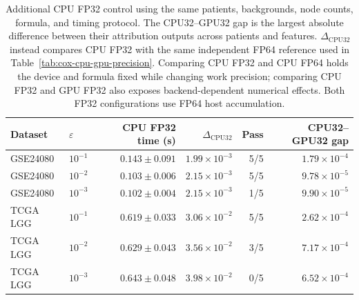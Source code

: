 \begin{table}[t]
\centering
\small
\setlength{\tabcolsep}{4pt}
\begin{tabular}{llrrrr}
\toprule
Dataset & $\varepsilon$ & CPU FP32 time (s) & $\Delta_{\mathrm{CPU32}}$ & Pass
& CPU32--GPU32 gap \\
\midrule
GSE24080 & $10^{-1}$ & $0.143\pm0.091$ & $1.99\times10^{-3}$ & 5/5 & $1.79\times10^{-4}$ \\
GSE24080 & $10^{-2}$ & $0.103\pm0.006$ & $2.15\times10^{-3}$ & 5/5 & $9.78\times10^{-5}$ \\
GSE24080 & $10^{-3}$ & $0.102\pm0.004$ & $2.15\times10^{-3}$ & 1/5 & $9.90\times10^{-5}$ \\
\midrule
TCGA LGG & $10^{-1}$ & $0.619\pm0.033$ & $3.06\times10^{-2}$ & 5/5 & $2.62\times10^{-4}$ \\
TCGA LGG & $10^{-2}$ & $0.629\pm0.043$ & $3.56\times10^{-2}$ & 3/5 & $7.17\times10^{-4}$ \\
TCGA LGG & $10^{-3}$ & $0.643\pm0.048$ & $3.98\times10^{-2}$ & 0/5 & $6.52\times10^{-4}$ \\
\bottomrule
\end{tabular}
\caption{Additional CPU FP32 control using the same patients, backgrounds,
node counts, formula, and timing protocol. The CPU32--GPU32 gap is the largest
absolute difference between their attribution outputs across patients and
features. $\Delta_{\mathrm{CPU32}}$ instead compares CPU FP32 with the same
independent FP64 reference used in Table~\ref{tab:cox-cpu-gpu-precision}.
Comparing CPU FP32 and CPU FP64 holds the device and formula fixed while
changing work precision; comparing CPU FP32 and GPU FP32 also exposes
backend-dependent numerical effects. Both FP32 configurations use FP64
host accumulation.}
\label{tab:cox-cpu-precision-control}
\end{table}
